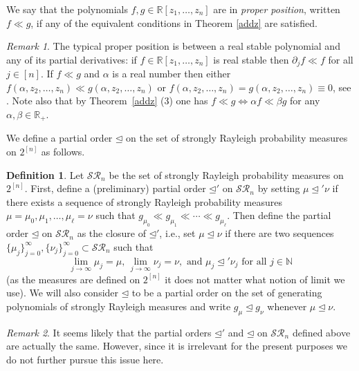 \documentclass[10pt,reqno]{amsart}
\theoremstyle{plain}
\theoremstyle{definition}
\newtheorem{definition}{Definition}[section]
\theoremstyle{remark}
\newtheorem{remark}{Remark}[section]
\newcommand{\NN}{\mathbb{N}}
\newcommand{\SR}{\mathcal{SR}}
\newcommand{\RR}{\mathbb{R}}
\begin{document}
We say that the polynomials $f, g \in \RR[z_1,\ldots,z_n]$ are in 
{\em proper position}, written $f \ll g$, if any of the equivalent 
conditions in Theorem \ref{addz} are satisfied. 

\begin{remark}\label{dada}
The typical proper position is between a real stable polynomial and any of its 
partial derivatives: 
if $f \in \RR[z_1,\ldots,z_n]$ is real stable then 
$\partial_j f \ll f$ for all $j\in [n]$. 
If $f \ll g$ and $\alpha$ is a real number then either 
$f(\alpha,z_2,\ldots,z_n) \ll g(\alpha,z_2,\ldots,z_n)$ or  
$f(\alpha,z_2,\ldots,z_n)= g(\alpha,z_2,\ldots,z_n)\equiv 0$, see \cite{BBS2}.
Note also that by Theorem~\ref{addz} (3) one has $f\ll g\Leftrightarrow 
\alpha f\ll \beta g$ for any $\alpha,\beta\in \RR_+$.
\end{remark} 

We define a partial order $\unlhd$ on the set of strongly Rayleigh 
probability measures on $2^{[n]}$ as follows. 
 
\begin{definition}\label{d-order}
 Let $\SR_n$ be the set of  strongly Rayleigh probability measures on 
$2^{[n]}$. First, define a (preliminary) partial order $\unlhd'$ on $\SR_n$ 
by setting $\mu \unlhd' \nu$ if there exists a sequence of  strongly 
Rayleigh probability measures $\mu=\mu_0, \mu_1, \ldots, 
 \mu_\ell=\nu$ such that 
 $g_{\mu_0} \ll g_{\mu_1} \ll \cdots \ll g_{\mu_\ell}$. Then 
 define the partial order $\unlhd$ on $\SR_n$ as the closure of 
$\unlhd'$, i.e., set $\mu \unlhd \nu$ if there are two sequences 
 $\{\mu_j\}_{j=0}^{\infty}, \{\nu_j\}_{j=0}^{\infty} \subset \SR_n$ such that 
 $$
 \lim_{j \rightarrow \infty} \mu_j =\mu,\, 
 \lim_{j \rightarrow \infty} \nu_j =\nu, \mbox{ and } 
\mu_j \unlhd' \nu_j \text{ for all } j \in \NN 
 $$
(as the measures are defined 
on $2^{[n]}$ it does not matter what notion of limit we use). 
We will also consider $\unlhd$  to be a partial order on 
 the set of generating polynomials of strongly Rayleigh measures and write 
$g_{\mu} \unlhd g_{\nu}$ whenever $\mu \unlhd \nu$.   
\end{definition}

\begin{remark}
It seems likely that the partial orders $\unlhd'$ and $\unlhd$ on $\SR_n$ 
defined above are actually the same. However, since it is 
irrelevant for the present purposes we do not further pursue this 
issue here.
\end{remark}
\end{document}
